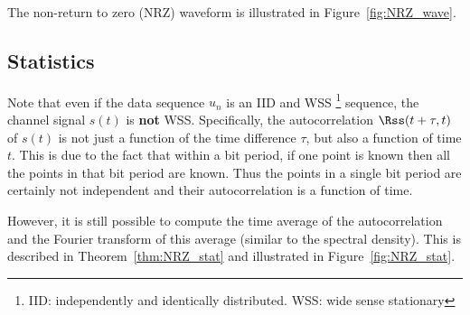 The non-return to zero (NRZ) waveform is illustrated in Figure~\ref{fig:NRZ_wave}.

\subsection{Statistics}
Note that even if the data sequence $u_n$ is an IID and WSS 
\footnote{IID: independently and identically distributed. 
WSS: wide sense stationary}
sequence, 
the channel signal $s(t)$ is {\bf not} WSS.
Specifically, the autocorrelation 
$\Rss(t+\tau,t)$ of $s(t)$ is not just a function of the time difference $\tau$,
but also a function of time $t$.
This is due to the fact that within a bit period, if one point is known
then all the points in that bit period are known.
Thus the points in a single bit period are 
certainly not independent and their autocorrelation is a function of time.

However, it is still possible to compute the time average of the 
autocorrelation and the Fourier transform of this average
(similar to the spectral density).
This is described in Theorem~\ref{thm:NRZ_stat} and 
illustrated in Figure~\ref{fig:NRZ_stat}.


